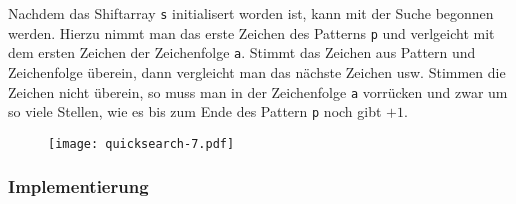 \noindent
Nachdem das Shiftarray \verb!s! initialisert worden ist, kann mit der
Suche begonnen werden. Hierzu nimmt man das erste Zeichen des Patterns
\verb!p! und verlgeicht mit dem ersten Zeichen der Zeichenfolge \verb!a!.
Stimmt das Zeichen aus Pattern und Zeichenfolge überein, dann vergleicht
man das nächste Zeichen usw. Stimmen die Zeichen nicht überein, so
muss man in der Zeichenfolge \verb!a! vorrücken und zwar um so viele 
Stellen, wie es bis zum Ende des Pattern \verb!p! noch gibt $+1$.

\begin{figure}[h!]
	\centering
	\texttt{[image: quicksearch-7.pdf]}
\end{figure}

\subsubsection{Implementierung}




